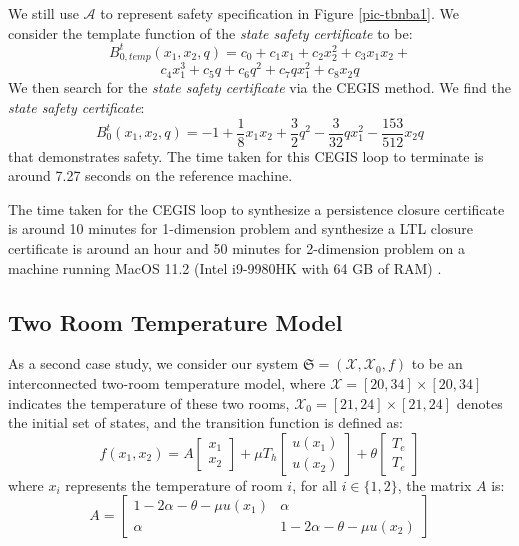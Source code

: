 \documentclass[acmlarge]{acmart}
\begin{document}
We still use $\mathcal{A}$ to represent safety specification in Figure \ref{pic-tbnba1}. 
We consider the template function of the \emph{state safety certificate} to be:
$$B_{0,temp}^{t}(x_1, x_2, q) = c_0 + c_1x_1 + c_2x_2^2 + c_3x_1x_2 + $$
$$c_4x_1^3 + c_5q + c_6q^2 + c_7qx_1^2 + c_8x_2q$$
We then search for the \emph{state safety certificate} via the CEGIS method. 
We find the \emph{state safety certificate}: $$B_0^t(x_1, x_2, q) = -1 +  \frac{1}{8}x_1x_2 + \frac{3}{2}q^2 - \frac{3}{32}qx_1^2 - \frac{153}{512}x_2q$$ that demonstrates safety. 
The time taken for this CEGIS loop to terminate is around 7.27 seconds on the reference machine. 

The time taken for the CEGIS loop to synthesize a persistence closure certificate is around 10 minutes for 1-dimension problem and synthesize a LTL closure certificate is around an hour and 50 minutes for 2-dimension problem on a machine running MacOS 11.2 (Intel i9-9980HK with 64 GB of RAM) \cite{murali2024closure}.

\subsection{Two Room Temperature Model}
As a second case study, we consider our system $\mathfrak{S} = (\mathcal{X}, \mathcal{X}_0, f)$ to be
an interconnected two-room temperature model, where $\mathcal{X} = [20, 34] \times [20, 34]$ indicates the temperature of these two rooms, $\mathcal{X}_0 = [21, 24] \times [21, 24]$ denotes the initial set of states, and the transition function is defined as:
$$
f(x_1, x_2) = A 
\begin{bmatrix}
  x_1 \\
  x_2
\end{bmatrix}
+\mu T_h 
\begin{bmatrix}
  u(x_1) \\
  u(x_2)
\end{bmatrix}
+
\theta
\begin{bmatrix}
  T_e \\ 
  T_e
\end{bmatrix}
$$
where $x_i$ represents the temperature of room $i$, for all $i \in \{1, 2\}$, the
matrix $A$ is:
$$
A = 
\begin{bmatrix}
  1 - 2\alpha - \theta - \mu u(x_1) & \alpha \\
  \alpha & 1 - 2\alpha - \theta - \mu u(x_2)
\end{bmatrix}
$$ 
\end{document}
